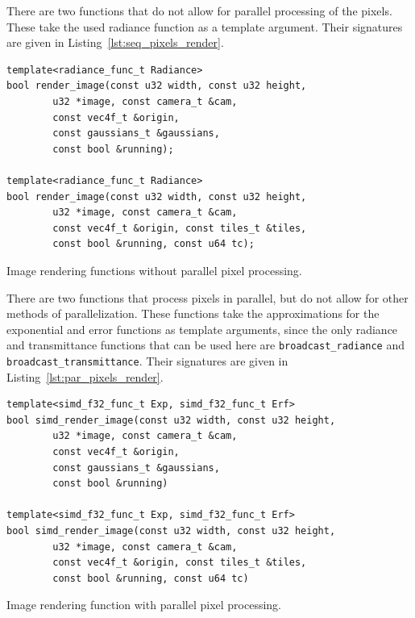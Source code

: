 \documentclass[a4paper, 11pt]{memoir}
\begin{document}
    There are two functions that do not allow for parallel processing of the pixels. These take the used \gls{radiance}
    function as a template argument. Their signatures are given in Listing~\ref{lst:seq_pixels_render}.

    \begin{listing}[t]
        \begin{verbatim}
template<radiance_func_t Radiance>
bool render_image(const u32 width, const u32 height,
        u32 *image, const camera_t &cam,
        const vec4f_t &origin,
        const gaussians_t &gaussians,
        const bool &running);

template<radiance_func_t Radiance>
bool render_image(const u32 width, const u32 height,
        u32 *image, const camera_t &cam,
        const vec4f_t &origin, const tiles_t &tiles,
        const bool &running, const u64 tc);
        \end{verbatim}
        \caption{Image rendering functions without parallel pixel processing.}
        \label{lst:seq_pixels_render}
    \end{listing}

    There are two functions that process pixels in parallel, but do not allow for other methods of parallelization. These
    functions take the approximations for the exponential and error functions as template arguments, since the only
    \gls{radiance} and \gls{transmittance} functions that can be used here are \texttt{broadcast_radiance} and
    \texttt{broadcast_transmittance}. Their signatures are given in Listing~\ref{lst:par_pixels_render}.

    \begin{listing}[t]
        \begin{verbatim}
template<simd_f32_func_t Exp, simd_f32_func_t Erf>
bool simd_render_image(const u32 width, const u32 height,
        u32 *image, const camera_t &cam,
        const vec4f_t &origin,
        const gaussians_t &gaussians,
        const bool &running)

template<simd_f32_func_t Exp, simd_f32_func_t Erf>
bool simd_render_image(const u32 width, const u32 height,
        u32 *image, const camera_t &cam,
        const vec4f_t &origin, const tiles_t &tiles,
        const bool &running, const u64 tc)
        \end{verbatim}
        \caption{Image rendering function with parallel pixel processing.}
        \label{lst:par_pixels_render}
    \end{listing}
\end{document}
